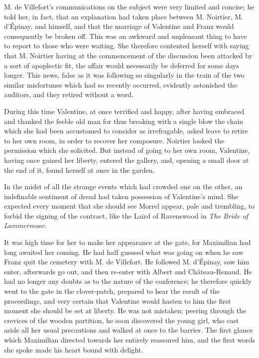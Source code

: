  M. de Villefort's communications on the subject were very limited and concise; he told her, in fact, that an explanation had taken place between M. Noirtier, M. d'Épinay, and himself, and that the marriage of Valentine and Franz would consequently be broken off. This was an awkward and unpleasant thing to have to report to those who were waiting. She therefore contented herself with saying that M. Noirtier having at the commencement of the discussion been attacked by a sort of apoplectic fit, the affair would necessarily be deferred for some days longer. This news, false as it was following so singularly in the train of the two similar misfortunes which had so recently occurred, evidently astonished the auditors, and they retired without a word. 

 During this time Valentine, at once terrified and happy, after having embraced and thanked the feeble old man for thus breaking with a single blow the chain which she had been accustomed to consider as irrefragable, asked leave to retire to her own room, in order to recover her composure. Noirtier looked the permission which she solicited. But instead of going to her own room, Valentine, having once gained her liberty, entered the gallery, and, opening a small door at the end of it, found herself at once in the garden. 

 In the midst of all the strange events which had crowded one on the other, an indefinable sentiment of dread had taken possession of Valentine's mind. She expected every moment that she should see Morrel appear, pale and trembling, to forbid the signing of the contract, like the Laird of Ravenswood in \textit{The Bride of Lammermoor}. 

 It was high time for her to make her appearance at the gate, for Maximilian had long awaited her coming. He had half guessed what was going on when he saw Franz quit the cemetery with M. de Villefort. He followed M. d'Épinay, saw him enter, afterwards go out, and then re-enter with Albert and Château-Renaud. He had no longer any doubts as to the nature of the conference; he therefore quickly went to the gate in the clover-patch, prepared to hear the result of the proceedings, and very certain that Valentine would hasten to him the first moment she should be set at liberty. He was not mistaken; peering through the crevices of the wooden partition, he soon discovered the young girl, who cast aside all her usual precautions and walked at once to the barrier. The first glance which Maximilian directed towards her entirely reassured him, and the first words she spoke made his heart bound with delight. 

